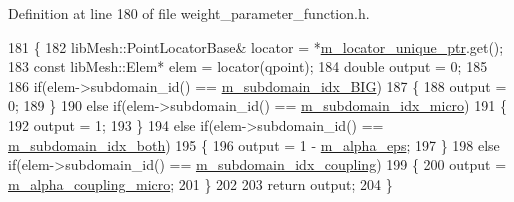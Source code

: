 Definition at line 180 of file weight\+\_\+parameter\+\_\+function.\+h.


\begin{DoxyCode}
181     \{
182         libMesh::PointLocatorBase& locator = *\hyperlink{classweight__parameter__function_ae37938d69363743baba5797c599e0640}{m\_locator\_unique\_ptr}.get();
183         \textcolor{keyword}{const} libMesh::Elem* elem = locator(qpoint);
184         \textcolor{keywordtype}{double} output = 0;
185 
186         \textcolor{keywordflow}{if}(elem->subdomain\_id() == \hyperlink{classweight__parameter__function_a1d22b2e8b9faff31c8fa0ef2161144e5}{m\_subdomain\_idx\_BIG})
187         \{
188             output = 0;
189         \}
190         \textcolor{keywordflow}{else} \textcolor{keywordflow}{if}(elem->subdomain\_id() == \hyperlink{classweight__parameter__function_a21eb1aebdae4706322cb17982c931eef}{m\_subdomain\_idx\_micro})
191         \{
192             output = 1;
193         \}
194         \textcolor{keywordflow}{else} \textcolor{keywordflow}{if}(elem->subdomain\_id() == \hyperlink{classweight__parameter__function_a0e5865143597a2ce9a19acaaa37a5bca}{m\_subdomain\_idx\_both})
195         \{
196             output = 1 - \hyperlink{classweight__parameter__function_a6ad313072643dbac787120791eeeac26}{m\_alpha\_eps};
197         \}
198         \textcolor{keywordflow}{else} \textcolor{keywordflow}{if}(elem->subdomain\_id() == \hyperlink{classweight__parameter__function_a516c68be83fc9cdc80c8bf4aecf395a4}{m\_subdomain\_idx\_coupling})
199         \{
200             output = \hyperlink{classweight__parameter__function_a2136698edf313c3d9250027b07cfeb52}{m\_alpha\_coupling\_micro};
201         \}
202 
203         \textcolor{keywordflow}{return} output;
204     \}
\end{DoxyCode}
\hypertarget{classweight__parameter__function_a63d24620e05e1a33a507986bac1a4c57}{}
